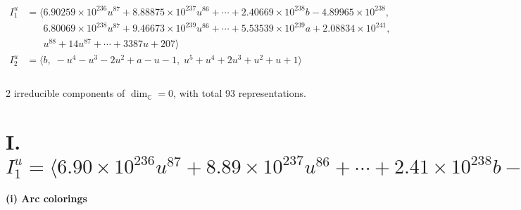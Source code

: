 \documentclass[1p]{elsarticle_modified}
\theoremstyle{definition}
\begin{document}
\begin{align*}
I^u_{1}&=\langle 
6.90259\times10^{236} u^{87}+8.88875\times10^{237} u^{86}+\cdots+2.40669\times10^{238} b-4.89965\times10^{238},\\
\phantom{I^u_{1}}&\phantom{= \langle  }6.80069\times10^{238} u^{87}+9.46673\times10^{239} u^{86}+\cdots+5.53539\times10^{239} a+2.08834\times10^{241},\\
\phantom{I^u_{1}}&\phantom{= \langle  }u^{88}+14 u^{87}+\cdots+3387 u+207\rangle \\
I^u_{2}&=\langle 
b,\;- u^4- u^3-2 u^2+a- u-1,\;u^5+u^4+2 u^3+u^2+u+1\rangle \\
\\
\end{align*}
\raggedright * 2 irreducible components of $\dim_{\mathbb{C}}=0$, with total 93 representations.\\
\newpage
\renewcommand{\arraystretch}{1}
\centering \section*{I. $I^u_{1}= \langle 6.90\times10^{236} u^{87}+8.89\times10^{237} u^{86}+\cdots+2.41\times10^{238} b-4.90\times10^{238},\;6.80\times10^{238} u^{87}+9.47\times10^{239} u^{86}+\cdots+5.54\times10^{239} a+2.09\times10^{241},\;u^{88}+14 u^{87}+\cdots+3387 u+207 \rangle$}
\flushleft \textbf{(i) Arc colorings}\\
\end{document}
